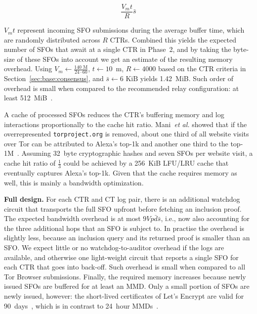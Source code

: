 \begin{equation} \label{eq:memory}
	\frac{V_mt}{R} \bar{s}
\end{equation}

$V_mt$ represent incoming SFO submissions during the average buffer time, which
are randomly distributed across $R$ CTRs.  Combined this yields the expected
number of SFOs that await at a single CTR in Phase~2, and by taking the
byte-size of these SFOs into account we get an estimate of the resulting memory
overhead.  Using
	$V_m \gets \frac{140\textrm{~M}}{24\cdot60}$,
	$t \gets 10$~m,
	$R \gets 4000$ based on the CTR criteria in
		Section~\ref{sec:base:consensus}, and
	$\bar{s} \gets 6\textrm{~KiB}$
yields 1.42~MiB.  Such order of overhead is small when compared to the
recommended relay configuration:
	at least 512~MiB~\cite{relay-config}.

A cache of processed SFOs reduces the CTR's buffering memory and log
interactions proportionally to the cache hit ratio.  Mani~\emph{et al.} showed
that if the overrepresented \texttt{torproject.org} is removed, about one third
of all website visits over Tor can be attributed to Alexa's top-1k and another
one third to the top-1M~\cite{mani}.
Assuming 32~byte cryptographic hashes and seven SFOs per website visit, a cache
hit ratio of $\frac{1}{3}$ could be achieved by a 256~KiB LFU/LRU cache that
eventually captures Alexa's top-1k.  Given that the cache requires memory as
well, this is mainly a bandwidth optimization.

\textbf{Full design.}
For each CTR and CT log pair, there is an additional watchdog circuit that
transports the full SFO upfront before fetching an inclusion proof.  The
expected bandwidth overhead is at most $9Vp\bar{d}\bar{s}$, i.e., now
also accounting for the three additional hops that an SFO is subject to.  In
practise the overhead is slightly less, because an inclusion query and its
returned proof is smaller than an SFO.  We expect little or no
watchdog-to-auditor overhead if the logs are available, and otherwise one
light-weight circuit that reports a single SFO for each CTR that goes into
back-off.  Such overhead is small when compared to all Tor Browser submissions.
Finally, the required memory increases because newly issued SFOs are buffered
for at least an MMD.  Only a small portion of SFOs are newly issued, however:
	the short-lived certificates of Let's Encrypt are valid for
	90~days~\cite{le}, which is in contrast to 24~hour
	MMDs~\cite{google-log-policy}.

